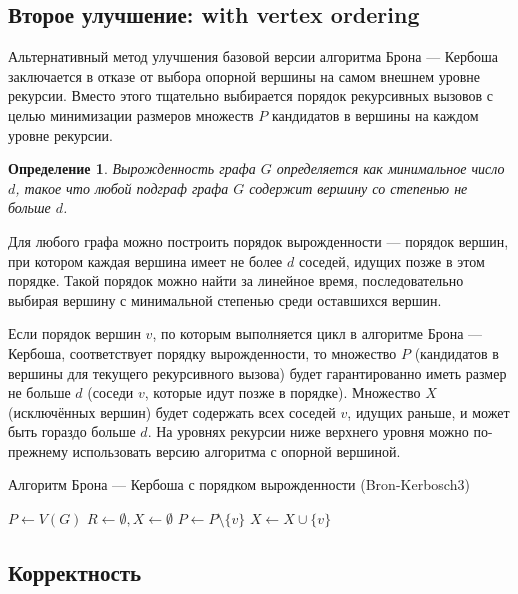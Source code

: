 \documentclass{article}
\newtheorem{theorem}{Определение}
\begin{document}
\subsection{Второе улучшение: with vertex ordering}

Альтернативный метод улучшения базовой версии алгоритма Брона — Кербоша заключается в отказе от выбора опорной вершины на самом внешнем уровне рекурсии. Вместо этого тщательно выбирается порядок рекурсивных вызовов с целью минимизации размеров множеств \( P \) кандидатов в вершины на каждом уровне рекурсии.

\begin{theorem}
Вырожденность графа \( G \) определяется как минимальное число \( d \), такое что любой подграф графа \( G \) содержит вершину со степенью не больше \( d \).
\end{theorem}

Для любого графа можно построить порядок вырожденности — порядок вершин, при котором каждая вершина имеет не более \( d \) соседей, идущих позже в этом порядке. Такой порядок можно найти за линейное время, последовательно выбирая вершину с минимальной степенью среди оставшихся вершин.

Если порядок вершин \( v \), по которым выполняется цикл в алгоритме Брона — Кербоша, соответствует порядку вырожденности, то множество \( P \) (кандидатов в вершины для текущего рекурсивного вызова) будет гарантированно иметь размер не больше \( d \) (соседи \( v \), которые идут позже в порядке). Множество \( X \) (исключённых вершин) будет содержать всех соседей \( v \), идущих раньше, и может быть гораздо больше \( d \). На уровнях рекурсии ниже верхнего уровня можно по-прежнему использовать версию алгоритма с опорной вершиной.

\begin{algorithm}
\caption{Алгоритм Брона — Кербоша с порядком вырожденности (Bron-Kerbosch3)}
\label{alg:bronkerbosch3}
\begin{algorithmic}[1]
    \State $P \gets V(G)$
    \State $R \gets \emptyset, X \gets \emptyset$
        \State {}
        \State $P \gets P \setminus \{v\}$
        \State $X \gets X \cup \{v\}$
    \EndFor
\EndProcedure
\end{algorithmic}
\end{algorithm}

\subsection{Корректность}
\end{document}
